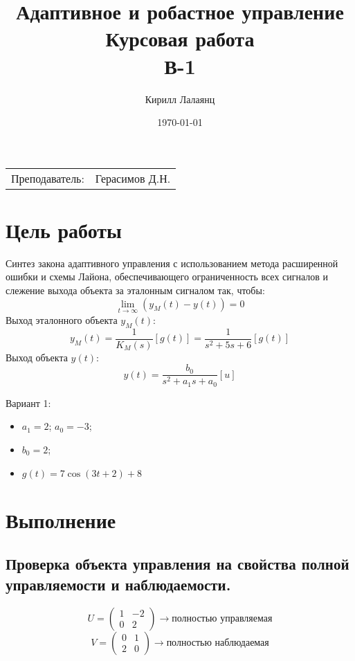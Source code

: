 \documentclass{article}
\title{Адаптивное и робастное управление \\ Курсовая работа\\ В-1} %
\author{Кирилл Лалаянц} %
\date{\today} %
\begin{document}
\maketitle %

\begin{center}
\begin{tabular}{l r}
Преподаватель: & Герасимов Д.Н. %
\end{tabular}
\end{center}
\newpage

\section{Цель работы}

Синтез закона адаптивного управления с использованием метода расширенной ошибки и схемы Лайона, обеспечивающего
ограниченность всех сигналов и слежение выхода объекта за эталонным
сигналом так, чтобы:
\[\lim_{t \rightarrow \infty}(y_M(t) - y(t)) = 0\]
Выход эталонного объекта \(y_M(t)\):
\[y_M(t) = \frac{1}{K_M(s)}[g(t)]=  \frac{1}{s^2 + 5s + 6}[g(t)]\]
Выход объекта \(y(t)\):
\[y(t) = \frac{b_0}{s^2 + a_1 s + a_0}[u]\]

Вариант 1: 
\begin{itemize}
  \item \(a_1 = 2\); \(a_0 = -3\);
  \item \(b_0 = 2\);
  \item \(g(t) = 7 \cos(3t + 2) + 8\)
\end{itemize}


\section{Выполнение}
\subsection{Проверка объекта управления на свойства полной управляемости и наблюдаемости.}
\[U = \begin{pmatrix}
  1 & -2 \\
  0 & 2
\end{pmatrix} \rightarrow \text{полностью управляемая}\]
\[V = \begin{pmatrix}
  0 & 1 \\
  2 & 0
\end{pmatrix} \rightarrow \text{полностью наблюдаемая}\]
\end{document}
